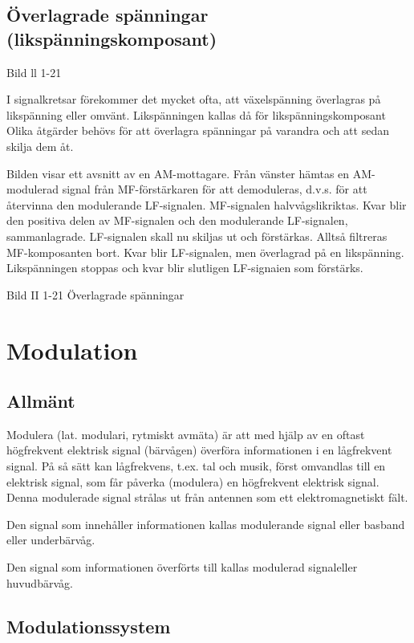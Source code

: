 \subsection{Överlagrade spänningar
(likspänningskomposant)}

Bild ll 1-21

I signalkretsar förekommer det mycket ofta, att växelspänning överlagras på likspänning
eller omvänt. Likspänningen kallas då för likspänningskomposant Olika åtgärder behövs för
att överlagra spänningar på varandra och att sedan skilja dem åt.

Bilden visar ett avsnitt av en AM-mottagare. Från vänster hämtas en AM-modulerad signal
från MF-förstärkaren för att demoduleras, d.v.s. för att återvinna den modulerande
LF-signalen. MF-signalen halvvågslikriktas. Kvar blir den positiva delen av MF-signalen
och den modulerande LF-signalen, sammanlagrade. LF-signalen skall nu skiljas ut och
förstärkas. Alltså filtreras MF-komposanten bort. Kvar blir LF-signalen, men överlagrad på
en likspänning. Likspänningen stoppas och kvar blir slutligen LF-signaien som förstärks.

Bild II 1-21 Överlagrade spänningar

\cleardoublepage

\section{Modulation}

\subsection{Allmänt}

Modulera (lat. modulari, rytmiskt avmäta) är att med hjälp av en oftast högfrekvent
elektrisk signal (bärvågen) överföra informationen i en lågfrekvent signal. På så sätt kan
lågfrekvens, t.ex. tal och musik, först omvandlas till en elektrisk signal, som får 
påverka (modulera) en högfrekvent elektrisk signal. Denna modulerade signal strålas ut från
antennen som ett elektromagnetiskt fält.

Den signal som innehåller informationen kallas modulerande signal eller basband eller
underbärvåg.

Den signal som informationen överförts till kallas modulerad signaleller huvudbärvåg.

\subsection{Modulationssystem}

